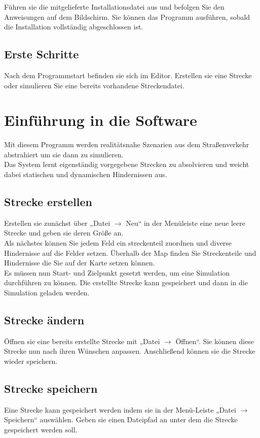 \documentclass[11pt,a4paper]{article}
\begin{document}
Führen sie die mitgelieferte Installationsdatei aus und befolgen Sie den Anweisungen auf dem Bildschirm. Sie können das Programm ausführen, sobald die Installation vollständig abgeschlossen ist.

\subsection{Erste Schritte}

Nach dem Programmstart befinden sie sich im Editor. Erstellen sie eine Strecke oder simulieren Sie eine bereits vorhandene Streckendatei.

\newpage
\section{Einführung in die Software}
Mit diesem Programm werden realitätsnahe Szenarien aus dem Straßenverkehr abstrahiert um sie dann zu simulieren. \\
Das System lernt eigenständig vorgegebene Strecken zu absolvieren und weicht dabei statischen und dynamischen Hindernissen aus.

\subsection{Strecke erstellen}
Erstellen sie zunächst über „Datei $\rightarrow$ Neu“ in der Menüleiste eine neue leere Strecke und geben sie deren Größe an. \\
Als nächstes können Sie jedem Feld ein streckenteil zuordnen und diverse Hindernisse auf die Felder setzen.
Überhalb der Map finden Sie Streckenteile und Hindernisse die Sie auf der Karte setzen können.\\
Es müssen nun Start- und Zielpunkt gesetzt werden, um eine Simulation durchführen zu können. Die erstellte Strecke kann gespeichert und dann in die Simulation geladen werden. \\

\subsection{Strecke ändern}
Öffnen sie eine bereits erstellte Strecke mit „Datei $\rightarrow$ Öffnen“. Sie können diese Strecke nun nach ihren Wünschen anpassen. 
Anschließend können sie die Strecke wieder speichern.
\newpage
\subsection{Strecke speichern}
Eine Strecke kann gespeichert werden indem sie in der Menü-Leiste „Datei $\rightarrow$ Speichern“ auswählen. Geben sie einen Dateipfad an unter dem die Strecke gespeichert werden soll.
\end{document}
